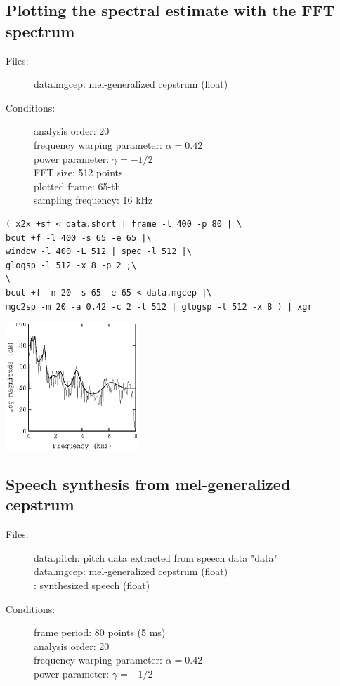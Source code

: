 \documentclass[a4paper,10pt]{article}
\begin{document}
\subsection{Plotting the spectral estimate with the FFT spectrum}

\begin{description}
\item[Files:]
  data.mgcep: mel-generalized cepstrum (float)
\item[Conditions:]
  analysis order: 20\\
  frequency warping parameter: $\alpha = 0.42$\\
  power parameter: $\gamma = -1/2$\\
  FFT size: 512 points\\
  plotted frame: 65-th\\
  sampling frequency: 16 kHz
\end{description}

\begin{verbatim}
( x2x +sf < data.short | frame -l 400 -p 80 | \
bcut +f -l 400 -s 65 -e 65 |\
window -l 400 -L 512 | spec -l 512 |\
glogsp -l 512 -x 8 -p 2 ;\
\
bcut +f -n 20 -s 65 -e 65 < data.mgcep |\
mgc2sp -m 20 -a 0.42 -c 2 -l 512 | glogsp -l 512 -x 8 ) | xgr
\end{verbatim}

\includegraphics[width=5cm]{eps/data.mgcep.glogsp.eps}

\subsection{Speech synthesis from mel-generalized cepstrum}

\begin{description}
\item[Files:]
  data.pitch: pitch data extracted from speech data "data"\\
  data.mgcep: mel-generalized cepstrum (float)\\
    :
  synthesized speech (float)
\item[Conditions:]
  frame period: 80 points (5 ms)\\
  analysis order: 20\\
  frequency warping parameter: $\alpha = 0.42$\\
  power parameter: $\gamma = -1/2$
\end{description}
\end{document}
